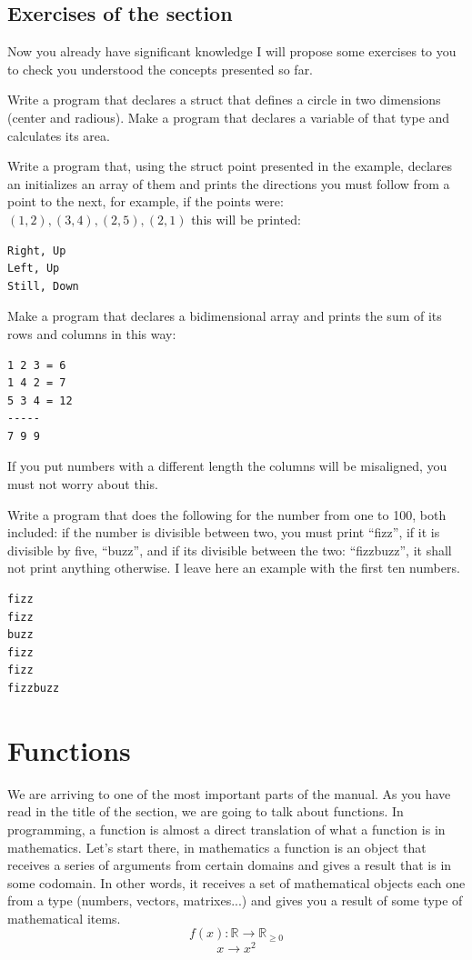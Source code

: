\documentclass[a4paper]{article}
\begin{document}
\subsection{Exercises of the section}
Now you already have significant knowledge I will propose some exercises to you
to check you understood the concepts presented so far.
\begin{exercises}
\item Write a program that declares a struct that defines a circle in two
dimensions (center and radious). Make a program that declares a variable of
that type and calculates its area.
\item Write a program that, using the struct point presented in the example,
declares an initializes an array of them and prints the directions you must
follow from a point to the next, for example, if the points were:
$(1, 2), (3, 4), (2, 5), (2, 1)$ this will be printed:
\begin{verbatim}
Right, Up
Left, Up
Still, Down
\end{verbatim}

\item Make a program that declares a bidimensional array and prints the
sum of its rows and columns in this way:

\begin{verbatim}
1 2 3 = 6
1 4 2 = 7
5 3 4 = 12
-----
7 9 9

\end{verbatim}

If you put numbers with a different length the columns will be
misaligned, you must not worry about this.

\item Write a program that does the following for the number from one to 100,
both included: if the number is divisible between two, you must print ``fizz'',
if it is divisible by five, ``buzz'', and if its divisible between the two:
``fizzbuzz'', it shall not print anything otherwise.
I leave here an example with the first ten numbers.
\begin{verbatim}
fizz
fizz
buzz
fizz
fizz
fizzbuzz
\end{verbatim}
\end{exercises}

\section{Functions}
\label{funciones}
We are arriving to one of the most important parts of the manual. As you
have read in the title of the section, we are going to talk about functions.
In programming, a function is almost a direct translation of what a function
is in mathematics. Let's start there, in mathematics a function is an object
that receives a series of arguments from certain domains and gives a result
that is in some codomain. In other words, it receives a set of mathematical
objects each one from a type (numbers, vectors, matrixes...) and gives you a
result of some type of mathematical items.
$$
f(x) : \mathbb{R} \longrightarrow \mathbb{R}_{\ge 0}
$$
$$
x \to x^2
$$
\end{document}
